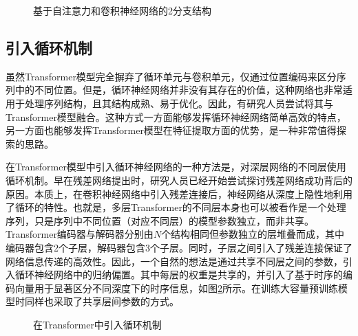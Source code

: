 \begin{figure}[htp]
\centering

\caption{基于自注意力和卷积神经网络的2分支结构}
\label{fig:15-7}
\end{figure}


\subsection{引入循环机制}

\parinterval 虽然Transformer模型完全摒弃了循环单元与卷积单元，仅通过位置编码来区分序列中的不同位置。但是，循环神经网络并非没有其存在的价值，这种网络也非常适用于处理序列结构，且其结构成熟、易于优化。因此，有研究人员尝试将其与Transformer模型融合。这种方式一方面能够发挥循环神经网络简单高效的特点，另一方面也能够发挥Transformer模型在特征提取方面的优势，是一种非常值得探索的思路。

\parinterval 在Transformer模型中引入循环神经网络的一种方法是，对深层网络的不同层使用循环机制。早在残差网络提出时，研究人员已经开始尝试探讨残差网络成功背后的原因。本质上，在卷积神经网络中引入残差连接后，神经网络从深度上隐性地利用了循环的特性。也就是，多层Transformer的不同层本身也可以被看作是一个处理序列，只是序列中不同位置（对应不同层）的模型参数独立，而非共享。Transformer编码器与解码器分别由$N$个结构相同但参数独立的层堆叠而成，其中编码器包含2个子层，解码器包含3个子层。同时，子层之间引入了残差连接保证了网络信息传递的高效性。因此，一个自然的想法是通过共享不同层之间的参数，引入循环神经网络中的归纳偏置。其中每层的权重是共享的，并引入了基于时序的编码向量用于显著区分不同深度下的时序信息，如图\ref{fig:15-8}所示。在训练大容量预训练模型时同样也采取了共享层间参数的方式。

\begin{figure}[htp]
\centering

\caption{在Transformer中引入循环机制}
\label{fig:15-8}
\end{figure}

